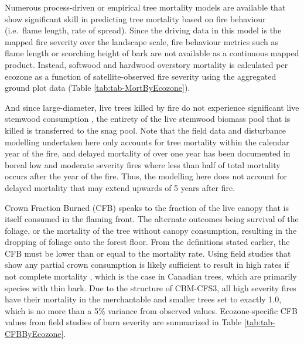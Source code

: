 \documentclass[, manuscript]{copernicus}
\begin{document}
Numerous process-driven \citep{michaletz2006} or empirical
\citep{hood2017} tree mortality models are available that show
significant skill in predicting tree mortality based on fire behaviour
(i.e.~flame length, rate of spread). Since the driving data in this
model is the mapped fire severity over the landscape scale, fire
behaviour metrics such as flame length or scorching height of bark are
not available as a continuous mapped product. Instead, softwood and
hardwood overstory mortality is calculated per ecozone as a function of
satellite-observed fire severity using the aggregated ground plot data
(Table \ref{tab:tab-MortByEcozone}).

And since large-diameter, live trees killed by fire do not experience
significant live stemwood consumption \citep{talucci2024}, the entirety
of the live stemwood biomass pool that is killed is transferred to the
snag pool. Note that the field data and disturbance modelling undertaken
here only accounts for tree mortality within the calendar year of the
fire, and delayed mortality of over one year has been documented in
boreal low and moderate severity fires \citep{angers2011} where less
than half of total mortality occurs after the year of the fire. Thus,
the modelling here does not account for delayed mortality that may
extend upwards of 5 years after fire.

Crown Fraction Burned (CFB) speaks to the fraction of the live canopy
that is itself consumed in the flaming front. The alternate outcomes
being survival of the foliage, or the mortality of the tree without
canopy consumption, resulting in the dropping of foliage onto the forest
floor. From the definitions stated earlier, the CFB must be lower than
or equal to the mortality rate. Using field studies that show any
partial crown consumption is likely sufficient to result in high rates
if not complete mortality \citep{hood2017}, which is the case in
Canadian trees, which are primarily species with thin bark. Due to the
structure of CBM-CFS3, all high severity fires have their mortality in
the merchantable and smaller trees set to exactly 1.0, which is no more
than a 5\% variance from observed values. Ecozone-specific CFB values
from field studies of burn severity are summarized in Table
\ref{tab:tab-CFBByEcozone}.
\end{document}
